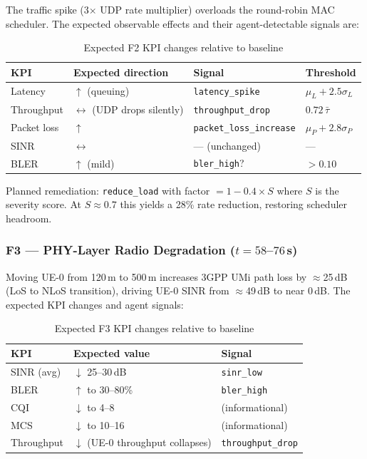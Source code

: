 \documentclass[12pt,a4paper]{article}
\begin{document}
The traffic spike (3$\times$ UDP rate multiplier) overloads the round-robin MAC
scheduler. The expected observable effects and their agent-detectable signals
are:

\begin{table}[H]
\centering
\caption{Expected F2 KPI changes relative to baseline}
\label{tab:f2}
\begin{tabular}{llll}
\toprule
\textbf{KPI} & \textbf{Expected direction} & \textbf{Signal} & \textbf{Threshold} \\
\midrule
Latency       & $\uparrow$ (queuing)   & \texttt{latency\_spike}      & $\mu_L + 2.5\sigma_L$ \\
Throughput    & $\leftrightarrow$ (UDP drops silently) & \texttt{throughput\_drop} & $0.72\,\bar{\tau}$ \\
Packet loss   & $\uparrow$             & \texttt{packet\_loss\_increase} & $\mu_P + 2.8\sigma_P$ \\
SINR          & $\leftrightarrow$       & --- (unchanged)            & --- \\
BLER          & $\uparrow$ (mild)       & \texttt{bler\_high}?       & $> 0.10$ \\
\bottomrule
\end{tabular}
\end{table}

Planned remediation: \texttt{reduce\_load} with factor $= 1 - 0.4 \times S$
where $S$ is the severity score. At $S \approx 0.7$ this yields a 28\%
rate reduction, restoring scheduler headroom.

\subsubsection{F3 — PHY-Layer Radio Degradation ($t = 58$--$76$\,s)}

Moving UE-0 from 120\,m to 500\,m increases 3GPP UMi path loss by
$\approx$25\,dB (LoS to NLoS transition), driving UE-0 SINR from
$\approx$49\,dB to near 0\,dB. The expected KPI changes and agent signals:

\begin{table}[H]
\centering
\caption{Expected F3 KPI changes relative to baseline}
\label{tab:f3}
\begin{tabular}{lll}
\toprule
\textbf{KPI} & \textbf{Expected value} & \textbf{Signal} \\
\midrule
SINR (avg) & $\downarrow$ 25--30\,dB & \texttt{sinr\_low} \\
BLER       & $\uparrow$ to 30--80\%  & \texttt{bler\_high} \\
CQI        & $\downarrow$ to 4--8    & (informational) \\
MCS        & $\downarrow$ to 10--16  & (informational) \\
Throughput & $\downarrow$ (UE-0 throughput collapses) & \texttt{throughput\_drop} \\
\bottomrule
\end{tabular}
\end{table}
\end{document}
